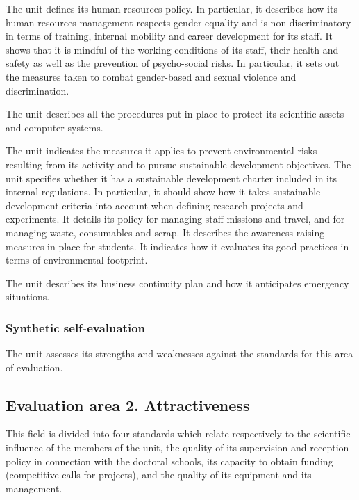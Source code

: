 \begin{hceresinstructions}
  The unit defines its human resources policy. In particular, it describes
  how its human resources management respects gender equality and is
  non-discriminatory in terms of training, internal mobility and career
  development for its staff. It shows that it is mindful of the working
  conditions of its staff, their health and safety as well as the
  prevention of psycho-social risks. In particular, it sets out the
  measures taken to combat gender-based and sexual violence and
  discrimination.

  The unit describes all the procedures put in place to protect its
  scientific assets and computer systems.

  The unit indicates the measures it applies to prevent environmental
  risks resulting from its activity and to pursue sustainable development
  objectives. The unit specifies whether it has a sustainable development
  charter included in its internal regulations. In particular, it should
  show how it takes sustainable development criteria into account when
  defining research projects and experiments. It details its policy for
  managing staff missions and travel, and for managing waste, consumables
  and scrap. It describes the awareness-raising measures in place for
  students. It indicates how it evaluates its good practices in terms of
  environmental footprint.

  The unit describes its business continuity plan and how it anticipates
  emergency situations.
\end{hceresinstructions}

\subsubsection*{Synthetic self-evaluation}

\begin{hceresinstructions}
  The unit assesses its strengths and weaknesses against the standards for
  this area of evaluation.
\end{hceresinstructions}

\subsection*{Evaluation area 2. Attractiveness}

\begin{hceresinstructions}
  This field is divided into four standards which relate respectively to
  the scientific influence of the members of the unit, the quality of its
  supervision and reception policy in connection with the doctoral
  schools, its capacity to obtain funding (competitive calls for
  projects), and the quality of its equipment and its management.
\end{hceresinstructions}

